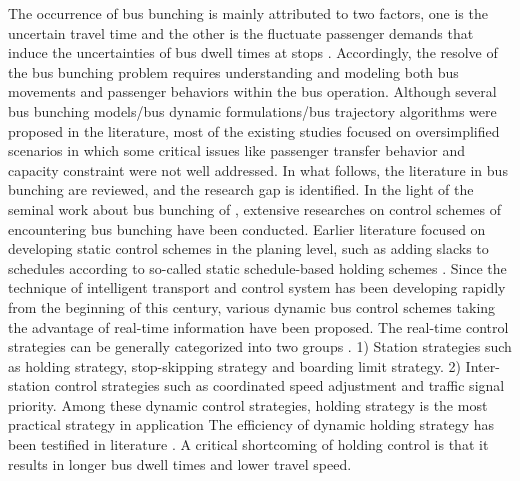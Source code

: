 \documentclass[smallextended]{svjour3}       %
\begin{document}
\begin{Abstract}
The occurrence of bus bunching is mainly attributed to two factors, one is the uncertain travel time and the other is the fluctuate passenger demands that induce the uncertainties of bus dwell times at stops \citep{2015Fonzone}.
Accordingly, the resolve of the bus bunching problem requires understanding and modeling both bus movements and passenger behaviors within the bus operation.
Although several bus bunching models/bus dynamic formulations/bus trajectory algorithms were proposed in the literature, most of the existing studies focused on oversimplified scenarios in which some critical issues like passenger transfer behavior and capacity constraint were not well addressed.
In what follows, the literature in bus bunching are reviewed, and the research gap is identified.
In the light of the seminal work about bus bunching of \cite{1964Nwell}, 
extensive researches on control schemes of encountering bus bunching have been conducted.
Earlier literature focused on developing static control schemes in the planing level, 
such as adding slacks to schedules according to so-called static schedule-based holding schemes 
\citep{1989Abkowitz,2001Eberlein}.%
Since the technique of intelligent transport and control system has been developing rapidly from the beginning of this century, various dynamic bus control schemes taking the advantage of real-time information have been proposed.
The real-time control strategies can be generally categorized into two groups \citep{2015Ibarra-Rojas}.
1) Station strategies such as holding strategy, stop-skipping strategy and boarding limit strategy.
2) Inter-station control strategies such as coordinated speed adjustment and traffic signal priority.
Among these dynamic control strategies, holding strategy is the most practical strategy in application \citep{2013Cats,2001Eberlein}
The efficiency of dynamic holding strategy has been testified in literature
\citep{2009Daganzo,2011Xuan,2012ABartholdi,2015Argote-Cabanero}.
A critical shortcoming of holding control is that it results in longer bus dwell times and lower travel speed.

\end{Abstract}
\end{document}

